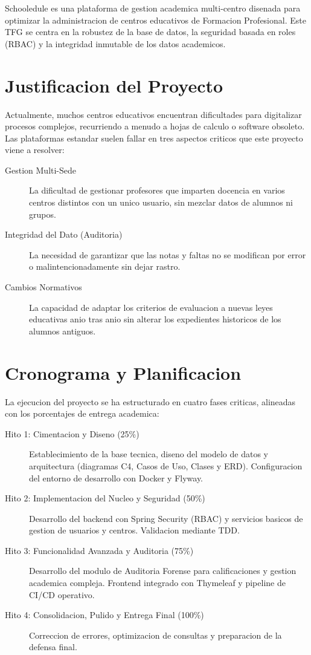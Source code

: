 Schooledule es una plataforma de gestion academica multi-centro disenada para optimizar la administracion de centros educativos de Formacion Profesional. Este TFG se centra en la robustez de la base de datos, la seguridad basada en roles (RBAC) y la integridad inmutable de los datos academicos.

\section{Justificacion del Proyecto}
Actualmente, muchos centros educativos encuentran dificultades para digitalizar procesos complejos, recurriendo a menudo a hojas de calculo o software obsoleto. Las plataformas estandar suelen fallar en tres aspectos criticos que este proyecto viene a resolver:

\begin{description}
    \item[Gestion Multi-Sede] La dificultad de gestionar profesores que imparten docencia en varios centros distintos con un unico usuario, sin mezclar datos de alumnos ni grupos.
    \item[Integridad del Dato (Auditoria)] La necesidad de garantizar que las notas y faltas no se modifican por error o malintencionadamente sin dejar rastro.
    \item[Cambios Normativos] La capacidad de adaptar los criterios de evaluacion a nuevas leyes educativas anio tras anio sin alterar los expedientes historicos de los alumnos antiguos.
\end{description}

\section{Cronograma y Planificacion}
La ejecucion del proyecto se ha estructurado en cuatro fases criticas, alineadas con los porcentajes de entrega academica:

\begin{description}
    \item[Hito 1: Cimentacion y Diseno (25\%)] Establecimiento de la base tecnica, diseno del modelo de datos y arquitectura (diagramas C4, Casos de Uso, Clases y ERD). Configuracion del entorno de desarrollo con Docker y Flyway.
    \item[Hito 2: Implementacion del Nucleo y Seguridad (50\%)] Desarrollo del backend con Spring Security (RBAC) y servicios basicos de gestion de usuarios y centros. Validacion mediante TDD.
    \item[Hito 3: Funcionalidad Avanzada y Auditoria (75\%)] Desarrollo del modulo de Auditoria Forense para calificaciones y gestion academica compleja. Frontend integrado con Thymeleaf y pipeline de CI/CD operativo.
    \item[Hito 4: Consolidacion, Pulido y Entrega Final (100\%)] Correccion de errores, optimizacion de consultas y preparacion de la defensa final.
\end{description}
